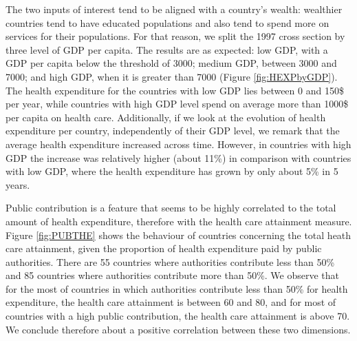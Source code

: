 \documentclass[12pt,a4paper]{article}\usepackage[]{graphicx}\usepackage[]{color}
\begin{document}

The two inputs of interest tend to be aligned with a country's wealth: wealthier countries tend to have educated populations and also tend to spend more on services for their populations. For that reason, we split the 1997 cross section by three level of GDP per capita. The results are as expected: low GDP, with a GDP per capita below the threshold of 3000; medium GDP, between 3000 and 7000; and high GDP, when it is greater than 7000 (Figure \ref{fig:HEXPbyGDP}).  
The health expenditure for the countries with low GDP lies between 0 and 150\$ per year, while countries with  high GDP level spend on average more than 1000\$ per capita on health care.  Additionally, if we look at the evolution of health expenditure per country, independently of their GDP level, we remark that the average health expenditure increased across time. However, in countries with high GDP the increase was relatively higher (about 11\%) in comparison with countries with low GDP, where the health expenditure has grown by only about 5\% in 5 years.



Public contribution is a feature that seems to be highly correlated to the total amount of health expenditure, therefore with the health care attainment measure. Figure \ref{fig:PUBTHE} shows the behaviour of countries concerning the total heath care attainment, given the proportion of health expenditure paid by public authorities.  There are 55 countries where authorities contribute less than 50\% and 85 countries where authorities contribute more than 50\%. We observe that for the most of countries in which authorities contribute less than 50\% for health expenditure, the health care attainment is between 60 and 80, and for most of countries with a high public contribution, the health care attainment is above 70. We conclude therefore about a positive correlation between these two dimensions.
\end{document}
